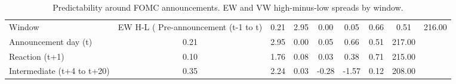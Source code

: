 \begin{table}[ht]
\centering
\caption{Predictability around FOMC announcements. EW and VW high-minus-low spreads by window.}
\label{tab:fomc_timeline}
\begin{tabular}{lccccccc}
\toprule
Window & EW H-L (%
\midrule
Pre-announcement (t-1 to t) & 0.21 & 2.95 & 0.00 & 0.05 & 0.66 & 0.51 & 216.00 \\
Announcement day (t) & 0.21 & 2.95 & 0.00 & 0.05 & 0.66 & 0.51 & 217.00 \\
Reaction (t+1) & 0.10 & 1.76 & 0.08 & 0.03 & 0.38 & 0.71 & 215.00 \\
Intermediate (t+4 to t+20) & 0.35 & 2.24 & 0.03 & -0.28 & -1.57 & 0.12 & 208.00 \\
\bottomrule
\end{tabular}
\end{table}
